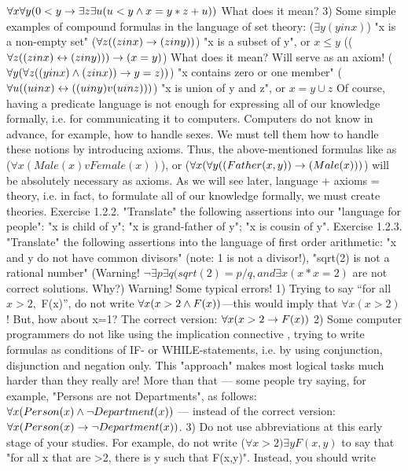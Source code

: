 \(\forall x\forall y(0<y \rightarrow  \exists z\exists u(u<y \wedge  x=y*z+u))\) What does it mean?
3) Some simple examples of compound formulas in the language of set theory:
(\(\exists y(y in x)\)) "x is a non-empty set"
(\(\forall z((z in x)\rightarrow (z in y))\)) "x is a subset of y", or \(x\leq y\)
((\(\forall z((z in x)\leftrightarrow ( z in y)))\rightarrow ( x=y)\)) What does it mean? Will serve as an axiom!
(\(\forall y(\forall z((y in x) \wedge  (z in x))\rightarrow y=z))\)) "x contains zero or one member"
(\(\forall u((u in x)\leftrightarrow ( (u in y) v (u in z)))\)) "x is union of y and z", or \(x=y\cup z\)
Of course, having a predicate language is not enough for expressing all of our knowledge formally, i.e.
for communicating it to computers. Computers do not know in advance, for example, how to handle
sexes. We must tell them how to handle these notions by introducing axioms. Thus, the above-mentioned
formulas like as (\(\forall x(Male(x) v Female(x))\)), or (\(\forall x(\forall y((Father(x, y))\rightarrow (Male(x)))\)) will be absolutely
necessary as axioms. As we will see later, language + axioms = theory, i.e. in fact, to formulate all of our
knowledge formally, we must create theories.
Exercise 1.2.2. "Translate" the following assertions into our "language for people":
"x is child of y";
"x is grand-father of y";
"x is cousin of y".
Exercise 1.2.3. "Translate" the following assertions into the language of first order arithmetic:
"x and y do not have common divisors" (note: 1 is not a divisor!),
"sqrt(2) is not a rational number"
(Warning! \(\neg \exists p\exists q(sqrt(2)=p/q, and \exists x(x*x=2)\) are not correct solutions. Why?)
Warning! Some typical errors!
1) Trying to say ``for all \(x>2,\) F(x)'', do not write \(\forall x(x>2\wedge F(x))\)---this would imply that \(\forall x(x>2)\)! But,
how about x=1? The correct version: \(\forall x(x>2\rightarrow F(x))\)
2) Some computer programmers do not like using the implication connective \IMPLIES , trying to write formulas
as conditions of IF- or WHILE-statements, i.e. by using conjunction, disjunction and negation only. This
"approach" makes most logical tasks much harder than they really are! More than that --- some people try
saying, for example, "Persons are not Departments", as follows:
\(\forall x(Person(x)\wedge \neg Department(x))\) --- instead of the correct version: \(\forall x(Person(x)\rightarrow \neg Department(x))\).
3) Do not use abbreviations at this early stage of your studies. For example, do not write (\(\forall x>2)\exists yF(x,y)\)
to say that "for all x that are >2, there is y such that F(x,y)". Instead, you should write

